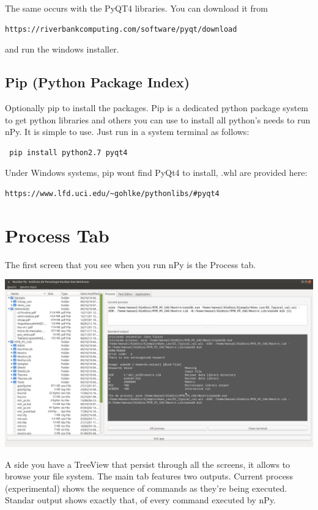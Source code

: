 \documentclass[a4paper,10pt]{article}
\begin{document}
The same occurs with the PyQT4 libraries. You can download it from 
\begin{verbatim}
https://riverbankcomputing.com/software/pyqt/download 
\end{verbatim}
\noindent and run the windows installer.

\subsection{Pip (Python Package Index)}

Optionally pip to install the packages. Pip is a dedicated python package system to get python libraries and others you can use to install all python's needs to run nPy. It is simple to use. Just run in a system terminal as follows:

\begin{verbatim}
 pip install python2.7 pyqt4
\end{verbatim}

\noindent Under Windows systems, pip wont find PyQt4 to install, .whl are provided here: 

\begin{verbatim}
https://www.lfd.uci.edu/~gohlke/pythonlibs/#pyqt4 
\end{verbatim}

\section{Process Tab}

The first screen that you see when you run nPy is the Process tab.

\begin{center}
 \includegraphics[width=\textwidth]{img/mainWindow.png}
\end{center}

A side you have a TreeView that persist through all the screens, it allows to browse your file system. The main tab features two outputs. Current process (experimental) shows the sequence of commands as they're being executed. Standar output shows exactly that, of every command executed by nPy.
\end{document}
